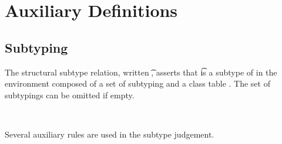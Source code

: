 \documentclass[a4paper,USenglish]{tex/lipics-v2016}
\begin{document}
\appendix
\section{Auxiliary Definitions}%

\subsection{Subtyping}

The structural subtype relation, written \StrSub\M\K\t\tp, asserts that \t
is a subtype of \tp in the environment composed of a set of subtyping \M and
a class table \K.   The set of subtypings can be omitted if empty.

~\\

\begin{mathpar}


\end{mathpar}

Several auxiliary rules are used in the subtype judgement. 

\begin{mathpar}



\end{mathpar}
\end{document}
